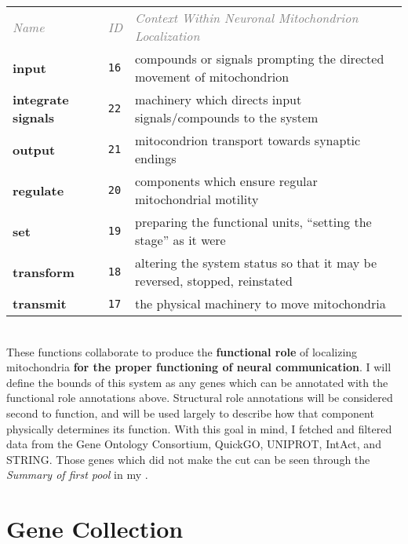 \begin{tabularx}{\linewidth}{l l X}
  \textit{\textcolor{grey}{Name}} & \textit{\textcolor{grey}{ID}} & \textit{\textcolor{grey}{Context Within Neuronal Mitochondrion Localization}} \\
  \textbf{input} & \texttt{16} & compounds or signals prompting the directed movement of mitochondrion \\
  \textbf{integrate signals} & \texttt{22} & machinery which directs input signals/compounds to the system \\
  \textbf{output} & \texttt{21} & mitocondrion transport towards synaptic endings \\
  \textbf{regulate} & \texttt{20} & components which ensure regular mitochondrial motility \\
  \textbf{set} & \texttt{19} & preparing the functional units, ``setting the stage'' as it were  \\
  \textbf{transform} & \texttt{18} & altering the system status so that it may be reversed, stopped, reinstated \\
  \textbf{transmit} & \texttt{17} & the physical machinery to move mitochondria \\
\end{tabularx} \\

These functions collaborate to produce the \textbf{functional role} of
localizing mitochondria \textbf{for the proper functioning of neural
communication}. I will define the bounds of this system as any genes which can
be annotated with the functional role annotations above. Structural role
annotations will be considered second to function, and will be used largely to
describe how that component physically determines its function. With this goal
in mind, I fetched and filtered data from the Gene Ontology Consortium, QuickGO,
UNIPROT, IntAct, and STRING. Those genes which did not make the cut can be seen
through the \textit{Summary of first pool} in my \firstpool.

\section{Gene Collection}

